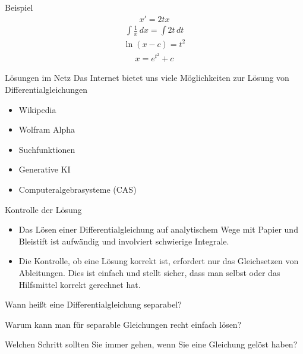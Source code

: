 \begin{frame}{Beispiel}
  \begin{gather*}
    x' = 2tx
  \end{gather*}
  \pause
  \begin{gather*}
    \int \frac1x\,dx = \int 2t \,dt
  \end{gather*}
  \pause
  \begin{gather*}
    \ln(x-c) = t^2
  \end{gather*}
  \pause
  \begin{gather*}
    x = e^{t^2}+c
  \end{gather*}
\end{frame}

\begin{frame}{Lösungen im Netz}
  Das Internet bietet uns viele Möglichkeiten zur Lösung von
  Differentialgleichungen
  \begin{itemize}
  \item Wikipedia
  \item Wolfram Alpha
  \item Suchfunktionen
  \item Generative KI
  \item Computeralgebrasysteme (CAS)
  \end{itemize}
\end{frame}

\begin{frame}{Kontrolle der Lösung}
  \begin{itemize}
  \item Das Lösen einer Differentialgleichung auf analytischem Wege mit
  \glqq{}Papier und Bleistift\grqq{} ist aufwändig und involviert
  schwierige Integrale.
\item Die Kontrolle, ob eine Lösung korrekt ist, erfordert nur das
  Gleichsetzen von Ableitungen. Dies ist einfach und stellt sicher,
  dass man selbst oder das Hilfsmittel korrekt gerechnet hat.
  \end{itemize}
\end{frame}

\begin{Abschluss}
\item Wann heißt eine Differentialgleichung separabel?
\item Warum kann man für separable Gleichungen recht einfach lösen?
\item Welchen Schritt sollten Sie immer gehen, wenn Sie eine Gleichung gelöst haben?
\end{Abschluss}

